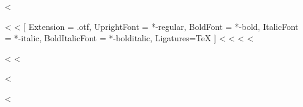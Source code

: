 <%
\usepackage[no-math]{fontspec}
  <%
\setmainfont{Arial}
  <%
\setmainfont{texgyretermes}[
  Extension = .otf,
  UprightFont = *-regular,
  BoldFont = *-bold,
  ItalicFont = *-italic,
  BoldItalicFont = *-bolditalic,
  Ligatures=TeX
]
\setsansfont[Scale=.9]{TeX Gyre Heros Regular}
\setmonofont[StylisticSet={1,3},Scale=.9]{inconsolata}
\RequirePackage{newtxmath}
  <%
  <%
<%
  <%
\usepackage[scaled=.95]{helvet}
  <%
\RequirePackage{newtxtext}
\RequirePackage{newtxmath}
\RequirePackage[zerostyle=b,scaled=.9]{newtxtt}
\RequirePackage[varl,scaled=.9]{inconsolata}
  <%
\usepackage[%
    rm={oldstyle=false,proportional=true},%
    sf={oldstyle=false,proportional=true},%
    tt={oldstyle=false,proportional=true,variable=false},%
    qt=false%
]{cfr-lm}
<%
\usepackage[T1]{fontenc}
<%

